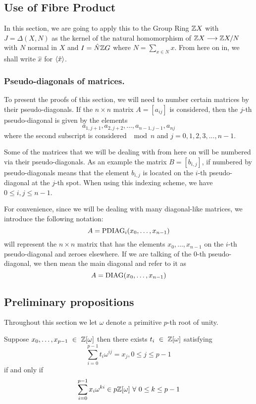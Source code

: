 \documentclass[11pt]{report}
\begin{document}
\subsection{Use of Fibre Product}

In this section, we are going to apply this to the Group Ring
\( \mathbb{Z}{}X\) with $J = \Delta(X,N)$ as the kernel of the natural
homomorphism of $ \mathbb{Z}{}X\longrightarrow{} \mathbb{Z}{}X/N$ with $N$ normal in $X$ and 
\(I = \hat{N} \mathbb{Z}{}G\) where \(N=\sum_{x\in{}N}x\). From here on in, we shall write $\hat{x}$ 
 for $\langle \hat{x} \rangle$.

\subsubsection{Pseudo-diagonals of matrices.}
        
To present the proofs of this section, we will need to number certain matrices by their
pseudo-diagonals. If the $n\times{}n$ matrix $A=[a_{ij}]$ is considered, then the $j$-th
pseudo-diagonal is given by the elements \[a_{1,j+1}, a_{2,j+2}, \ldots, a_{n-1,j-1}, a_{nj}\] where
the second subscript is considered $\mod{n}$ and $j=0,1,2,3,...,n-1$.

Some of the matrices that we will be dealing with from here on will be numbered via their
pseudo-diagonals.  As an example the matrix \(B = [b_{i,j}]\), if numbered by pseudo-diagonals means
that the element $b_{i,j}$ is located on the $i$-th pseudo-diagonal at the $j$-th spot. When using
this indexing scheme, we have $0\leq{}i,j\leq{}n-1$.

For convenience, since we will be dealing with many diagonal-like matrices, we introduce the
following notation: 
\[
A =  \mathrm{PDIAG}_i(x_{0}, \ldots, x_{n-1})
\] 
will represent the $n\times{}n$ matrix that has 
the elements \(x_0,\ldots,x_{n-1}\) on the $i$-th pseudo-diagonal and
zeroes elsewhere. If we are talking of the $0$-th pseudo-diagonal, we then mean the main diagonal and
refer to it as \[A =  \mathrm{DIAG}(x_{0}, \ldots, x_{n-1})\] 

\subsection{Preliminary propositions}

Throughout this section we let $\omega$ denote a primitive $p$-th root of unity.

\begin{proposition}
Suppose \(\series{0}{p-1}\ \in\ \integers[\omega]\) then there exists \(t_i\ \in\
 \mathbb{Z}[\omega]\) satisfying
\[\sum^{p-1}_{i=0} t_i\omega^{ij}=x_j, 0\leq{}j\leq{}p-1\] if and only if
\[\sum^{p-1}_{i=0}x_i\omega^{ki} \in{} p  \mathbb{Z}[\omega]\ \forall\ 0\leq{}k\leq{p-1}\]
\end{proposition}
\end{document}
